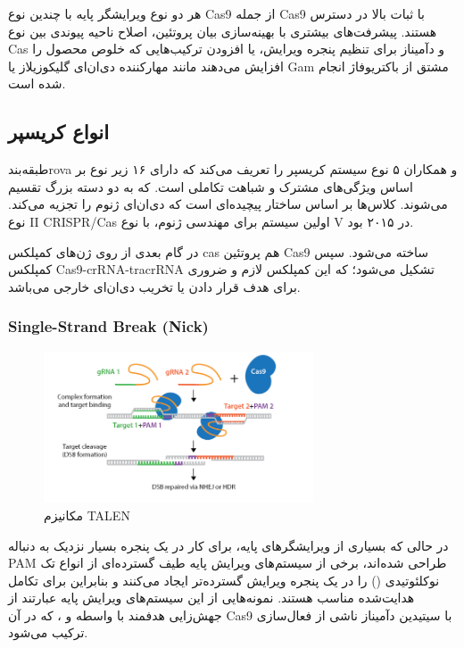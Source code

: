 \documentclass[12pt,a4paper,BCOR=.7cm,headsepline,bibliography=totoc]{report}
\begin{document}
هر دو نوع ویرایشگر پایه با چندین نوع Cas9 از جمله Cas9 با ثبات بالا در دسترس هستند. پیشرفت‌های بیشتری با بهینه‌سازی بیان پروتئین، اصلاح ناحیه پیوندی بین نوع Cas و دآمیناز برای تنظیم پنجره ویرایش، یا افزودن ترکیب‌هایی که خلوص محصول را افزایش می‌دهند مانند مهارکننده دی‌ان‌ای گلیکوزیلاز  یا Gam مشتق از باکتریوفاژ  انجام شده است.






\subsection{انواع کریسپر}
طبقه‌بندrova و همکاران ۵ نوع سیستم کریسپر را تعریف می‌کند که دارای ۱۶ زیر نوع بر اساس ویژگی‌های مشترک و شباهت تکاملی است. که به دو دسته بزرگ تقسیم می‌شوند. کلاس‌ها بر اساس ساختار پیچیده‌ای است که دی‌ان‌ای ژنوم را تجزیه می‌کند. نوع II CRISPR/Cas اولین سیستم برای مهندسی ژنوم، با نوع V در ۲۰۱۵ بود.

در گام بعدی از روی ژن‌های کمپلکس cas هم پروتئین Cas9 ساخته می‌شود. سپس کمپلکس Cas9-crRNA-tracrRNA تشکیل می‌شود؛ که این کمپلکس لازم و ضروری برای هدف قرار دادن یا تخریب دی‌ان‌ای خارجی می‌باشد.

\subsubsection{ Single-Strand Break (Nick)}
\begin{figure}
\centering
\includegraphics[width=8cm, ]{pictures/nick.png}
\caption{
مکانیزم TALEN \cite{addgene}
}\label{wrap-fig:4}
\end{figure}
در حالی که بسیاری از ویرایشگرهای پایه، برای کار در یک پنجره بسیار نزدیک به دنباله PAM طراحی شده‌اند، برخی از سیستم‌های ویرایش پایه طیف گسترده‌ای از انواع تک نوکلئوتیدی () را در یک پنجره ویرایش گسترده‌تر ایجاد می‌کنند و بنابراین برای تکامل هدایت‌شده مناسب هستند. نمونه‌هایی از این سیستم‌های ویرایش پایه عبارتند از جهش‌زایی هدفمند با واسطه  و ، که در آن Cas9 با سیتیدین دآمیناز  ناشی از فعال‌سازی ترکیب می‌شود.
\end{document}
